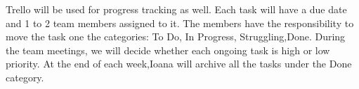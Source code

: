 \documentclass{article}
\begin{document}
Trello will be used for progress tracking as well. Each task will have a due date and 1 to 2 team members assigned to it. The members have the responsibility to move the task one the categories: To Do, In Progress, Struggling,Done. During the team meetings, we will decide whether each ongoing task is high or low priority. At the end of each week,Ioana will archive all the tasks under the Done category.









\end{document}
